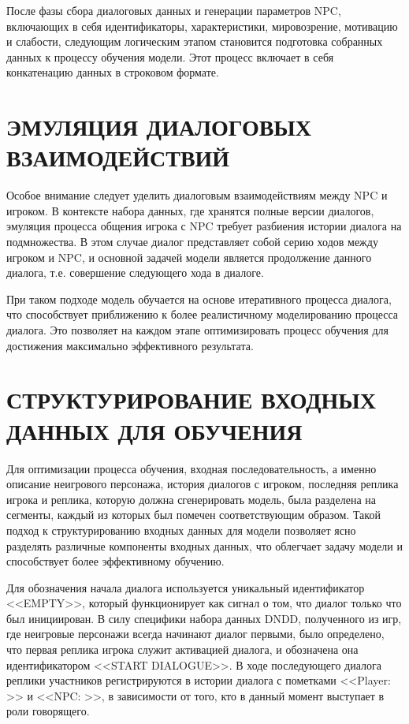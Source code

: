 После фазы сбора диалоговых данных и генерации параметров NPC, включающих в себя идентификаторы, характеристики, мировозрение, мотивацию и слабости, следующим логическим этапом становится подготовка собранных данных к процессу обучения модели. Этот процесс включает в себя конкатенацию данных в строковом формате.

\section{ЭМУЛЯЦИЯ ДИАЛОГОВЫХ ВЗАИМОДЕЙСТВИЙ}

Особое внимание следует уделить диалоговым взаимодействиям между NPC и игроком. В контексте набора данных, где хранятся полные версии диалогов, эмуляция процесса общения игрока с NPC требует разбиения истории диалога на подмножества. В этом случае диалог представляет собой серию ходов между игроком и NPC, и основной задачей модели является продолжение данного диалога, т.е. совершение следующего хода в диалоге.

При таком подходе модель обучается на основе итеративного процесса диалога, что способствует приближению к более реалистичному моделированию процесса диалога. Это позволяет на каждом этапе оптимизировать процесс обучения для достижения максимально эффективного результата.

\section{СТРУКТУРИРОВАНИЕ ВХОДНЫХ ДАННЫХ ДЛЯ ОБУЧЕНИЯ}

Для оптимизации процесса обучения, входная последовательность, а именно описание неигрового персонажа, история диалогов с игроком, последняя реплика игрока и реплика, которую должна сгенерировать модель, была разделена на сегменты, каждый из которых был помечен соответствующим образом. Такой подход к структурированию входных данных для модели позволяет ясно разделять различные компоненты входных данных, что облегчает задачу модели и способствует более эффективному обучению.

Для обозначения начала диалога используется уникальный идентификатор <<EMPTY>>, который функционирует как сигнал о том, что диалог только что был инициирован. В силу специфики набора данных DNDD, полученного из игр, где неигровые персонажи всегда начинают диалог первыми, было определено, что первая реплика игрока служит активацией диалога, и обозначена она идентификатором <<START DIALOGUE>>. В ходе последующего диалога реплики участников регистрируются в истории диалога с пометками <<Player: >> и <<NPC: >>, в зависимости от того, кто в данный момент выступает в роли говорящего.

